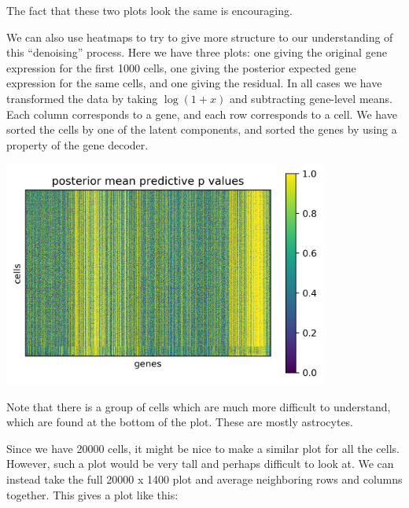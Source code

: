 The fact that these two plots look the same is encouraging.  

We can also use heatmaps to try to give more structure to our understanding of this ``denoising'' process.  Here we have three plots: one giving the original gene expression for the first 1000 cells, one giving the posterior expected gene expression for the same cells, and one giving the residual.  In all cases we have transformed the data by taking $\log(1+x)$ and subtracting gene-level means.  Each column corresponds to a gene, and each row corresponds to a cell.  We have sorted the cells by one of the latent components, and sorted the genes by using a property of the gene decoder.  

\includegraphics[width=0.8\textwidth]{pics/resids}

Note that there is a group of cells which are much more difficult to understand, which are found at the bottom of the plot.  These are mostly astrocytes.

Since we have 20000 cells, it might be nice to make a similar plot for all the cells.  However, such a plot would be very tall and perhaps difficult to look at.  We can instead take the full 20000 x 1400 plot and average neighboring rows and columns together.  This gives a plot like this:

